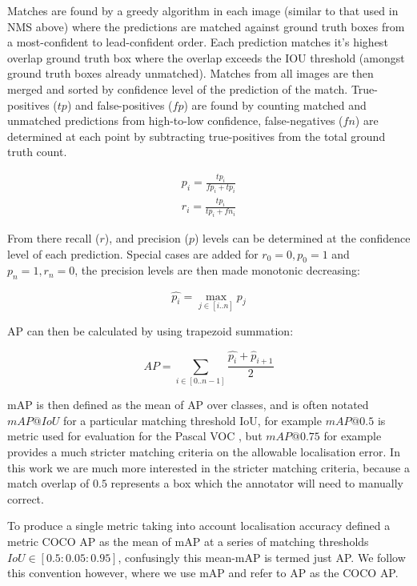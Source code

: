 Matches are found by a greedy algorithm in each image (similar to that used in \gls{NMS} above) where the predictions are matched against ground truth boxes from a most-confident to lead-confident order. Each prediction matches it's highest overlap ground truth box where the overlap exceeds the \gls{IOU} threshold (amongst ground truth boxes already unmatched). Matches from all images are then merged and sorted by confidence level of the prediction of the match. True-positives ($tp$) and false-positives ($fp$) are found by counting matched and unmatched predictions from high-to-low confidence, false-negatives ($fn$) are determined at each point by subtracting true-positives from the total ground truth count. 

\begin{equation*}
\begin{split}
p_i = \frac{tp_i}{fp_i + tp_i}\\
r_i = \frac{tp_i}{tp_i + fn_i}
\end{split}
\end{equation*}

From there recall ($r$), and precision ($p$) levels can be determined at the confidence level of each prediction. Special cases are added for $r_0=0, p_0=1$ and $p_n=1, r_n=0$, the precision levels are then made monotonic decreasing:

\begin{equation}
\hat{p_i} = \max_{j \in [i..n]}{p_j}
\end{equation}

\gls{AP} can then be calculated by using trapezoid summation:

\begin{equation}
AP = \sum_{i \in [0..n-1]}\frac{\hat{p_i} + \hat{p}_{i + 1}}{2}
\end{equation}



\gls{mAP} is then defined as the mean of \gls{AP} over classes, and is often notated $mAP@IoU$ for a particular matching threshold IoU, for example $mAP@0.5$ is metric used for evaluation for the Pascal VOC \cite{Everingham2008}, but $mAP@0.75$ for example provides a much stricter matching criteria on the allowable localisation error. In this work we are much more interested in the stricter matching criteria, because a match overlap of $0.5$ represents a box which the annotator will need to manually correct.

To produce a single metric taking into account localisation accuracy \cite{Lin2014} defined a metric COCO \gls{AP} as the mean of \gls{mAP} at a series of matching thresholds $ IoU \in [0.5 : 0.05 : 0.95] $, confusingly this mean-\gls{mAP} is termed just \gls{AP}. We follow this convention however, where we use \gls{mAP} and refer to \gls{AP} as the COCO \gls{AP}.

